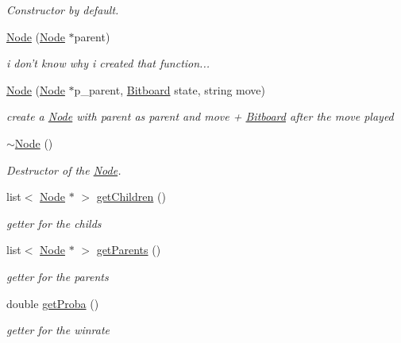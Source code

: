 \begin{DoxyCompactItemize}
\begin{DoxyCompactList}\small\item\em Constructor by default. \end{DoxyCompactList}\item 
\hyperlink{classmcts_1_1_node_ac5c6318435fbc51f472c9edf2866dd11}{Node} (\hyperlink{classmcts_1_1_node}{Node} $\ast$parent)
\begin{DoxyCompactList}\small\item\em i don't know why i created that function... \end{DoxyCompactList}\item 
\hyperlink{classmcts_1_1_node_adeb0ffbdae9c2967c8835426cf0effe5}{Node} (\hyperlink{classmcts_1_1_node}{Node} $\ast$p\+\_\+parent, \hyperlink{class_bitboard}{Bitboard} state, string move)
\begin{DoxyCompactList}\small\item\em create a \hyperlink{classmcts_1_1_node}{Node} with parent as parent and move + \hyperlink{class_bitboard}{Bitboard} after the move played \end{DoxyCompactList}\item 
\hyperlink{classmcts_1_1_node_acc91ea418dba8fa979b276e7d0a3af58}{$\sim$\+Node} ()
\begin{DoxyCompactList}\small\item\em Destructor of the \hyperlink{classmcts_1_1_node}{Node}. \end{DoxyCompactList}\item 
list$<$ \hyperlink{classmcts_1_1_node}{Node} $\ast$ $>$ \hyperlink{classmcts_1_1_node_a06fe80a95c5535f04c1f952b3e687d56}{get\+Children} ()
\begin{DoxyCompactList}\small\item\em getter for the childs \end{DoxyCompactList}\item 
list$<$ \hyperlink{classmcts_1_1_node}{Node} $\ast$ $>$ \hyperlink{classmcts_1_1_node_aa1670c2fae272a00356b88b6a8d382b9}{get\+Parents} ()
\begin{DoxyCompactList}\small\item\em getter for the parents \end{DoxyCompactList}\item 
double \hyperlink{classmcts_1_1_node_a15b5ee0530be2b48df18658f5caa0273}{get\+Proba} ()
\begin{DoxyCompactList}\small\item\em getter for the winrate \end{DoxyCompactList}\item 

\end{DoxyCompactItemize}
